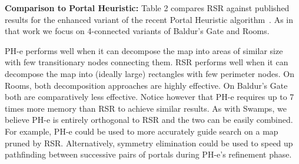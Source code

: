 \textbf{Comparison to Portal Heuristic:}
Table 2 compares RSR against published results for the enhanced variant of the
recent Portal Heuristic algorithm~\cite{goldenberg10}.  As in that work we focus
on 4-connected variants of Baldur's Gate and Rooms.
\par
PH-e performs well when it can decompose the map into areas of similar size with
few transitionary nodes connecting them.
RSR performs well when it can decompose the map into (ideally large) rectangles with few
perimeter nodes.
On Rooms, both decomposition approaches are highly effective. 
On Baldur's Gate both are comparatively less effective.
Notice however that PH-e requires up to 7 times more memory than RSR to achieve
similar results.
As with Swamps, we believe PH-e is entirely orthogonal to RSR and the two can be 
easily combined. For example, PH-e could be used to more accurately guide search
on a map pruned by RSR. Alternatively, symmetry elimination could be used to 
speed up pathfinding between successive pairs of portals during PH-e's refinement phase.

